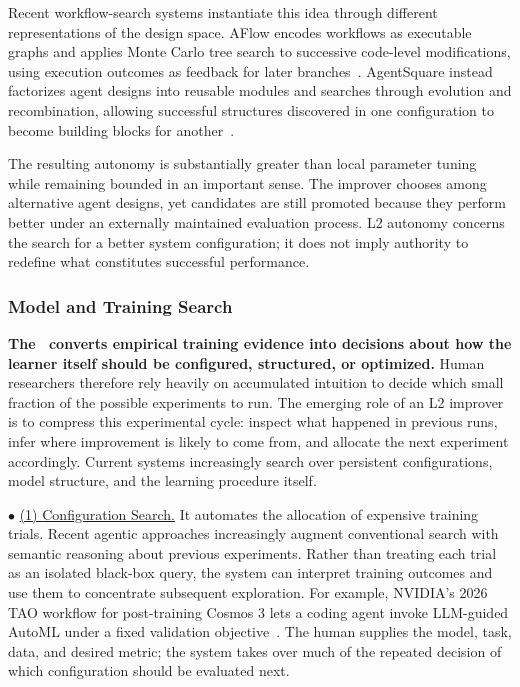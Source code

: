 Recent workflow-search systems instantiate this idea through different representations of the design space. 
AFlow encodes workflows as executable graphs and applies Monte Carlo tree search to successive code-level modifications, using execution outcomes as feedback for later branches~\cite{zhang2025aflow}.
AgentSquare instead factorizes agent designs into reusable modules and searches through evolution and recombination, allowing successful structures discovered in one configuration to become building blocks for another~\cite{shang2025agentsquare}.


The resulting autonomy is substantially greater than local parameter tuning while remaining bounded in an important sense. The improver chooses among alternative agent designs, yet candidates are still promoted because they perform better under an externally maintained evaluation process. L2 autonomy concerns the search for a better system configuration; it does not imply authority to redefine what constitutes successful performance.



\subsubsection{Model and Training Search}
\noindent\textbf{The \Improver \ converts empirical training evidence into decisions about how the learner itself should be configured, structured, or optimized.}
Human researchers therefore rely heavily on accumulated intuition to decide which small fraction of the possible experiments to run. The emerging role of an L2 improver is to compress this experimental cycle: inspect what happened in previous runs, infer where improvement is likely to come from, and allocate the next experiment accordingly. Current systems increasingly search over persistent configurations, model structure, and the learning procedure itself.

\noindent$\bullet$ \underline{(1) {Configuration Search.}}
{It automates the allocation of expensive training trials. }%
Recent agentic approaches increasingly augment conventional search with semantic reasoning about previous experiments. Rather than treating each trial as an isolated black-box query, the system can interpret training outcomes and use them to concentrate subsequent exploration. For example, NVIDIA's 2026 TAO workflow for post-training Cosmos 3 lets a coding agent invoke LLM-guided AutoML under a fixed validation objective~\cite{nvidia2026taoautoml}.
The human supplies the model, task, data, and desired metric; the system takes over much of the repeated decision of which configuration should be evaluated next.

